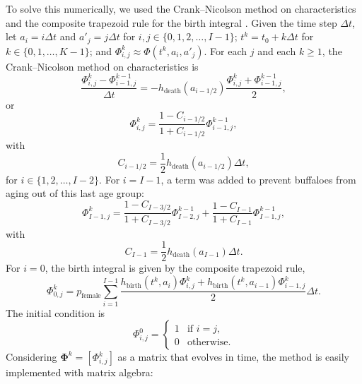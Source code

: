 \documentclass[12pt, UKenglish]{article}  %
\newcommand{\mat}[1]{\mathbf{#1}}
\begin{document}
To solve this numerically, we used the Crank--Nicolson method on
characteristics and the composite trapezoid rule for the birth
integral \autocite{milner_1992}.  Given the time step $\Delta t$,
let $a_i = i \Delta t$
and $a'_j = j \Delta t$
for $i, j \in \{0, 1, 2, \ldots, I - 1\}$;
$t^k = t_0 + k \Delta t$
for $k \in \{0, 1, \ldots, K - 1\}$;
and $\Phi_{i, j}^k \approx \Phi(t^k, a_i, a'_j)$.
For each $j$
and each $k \geq 1$, the Crank--Nicolson method on characteristics is
\begin{equation}
  \label{CN_step}
  \frac{\Phi_{i, j}^k - \Phi_{i - 1, j}^{k - 1}}{\Delta t}
  = - h_{\text{death}}(a_{i - 1 / 2})
  \frac{\Phi_{i, j}^k + \Phi_{i - 1, j}^{k - 1}}{2},
\end{equation}
or
\begin{equation}
  \Phi_{i, j}^k
  = \frac{1 - C_{i - 1 / 2}}{1 + C_{i - 1 / 2}}
  \Phi_{i - 1, j}^{k - 1},
\end{equation}
with
\begin{equation}
  C_{i - 1 / 2}
  = \frac{1}{2} h_{\text{death}}(a_{i - 1 / 2}) \Delta t,
\end{equation}
for $i \in \{1, 2, \ldots, I - 2\}$.  For $i = I - 1$,
a term was added to prevent buffaloes from aging out of this
last age group:
\begin{equation}
  \Phi_{I - 1, j}^k
  = \frac{1 - C_{I - 3 / 2}}{1 + C_{I - 3 / 2}}
  \Phi_{I - 2, j}^{k - 1}
  + \frac{1 - C_{I - 1}}{1 + C_{I - 1}}
  \Phi_{I - 1, j}^{k - 1},
\end{equation}
with
\begin{equation}
  C_{I - 1}
  = \frac{1}{2} h_{\text{death}}(a_{I - 1}) \Delta t.
\end{equation}
For $i = 0$, the birth integral is given by the composite trapezoid rule,
\begin{equation}
  \label{birth_step}
  \Phi_{0, j}^k =
  p_{\text{female}}
  \sum_{i = 1}^{I - 1}
  \frac{h_{\text{birth}}(t^k, a_i) \Phi_{i, j}^k +
    h_{\text{birth}}(t^k, a_{i - 1}) \Phi_{i - 1, j}^k}{2}
  \Delta t.
\end{equation}
The initial condition is
\begin{equation}
  \Phi_{i, j}^0 =
  \begin{cases}
    1 & \text{if $i = j$}, \\
    0 & \text{otherwise}.
  \end{cases}
\end{equation}
Considering $\mat{\Phi}^k = [\Phi_{i, j}^k]$ as a matrix that
evolves in time, the method is easily implemented with matrix algebra:
\end{document}
